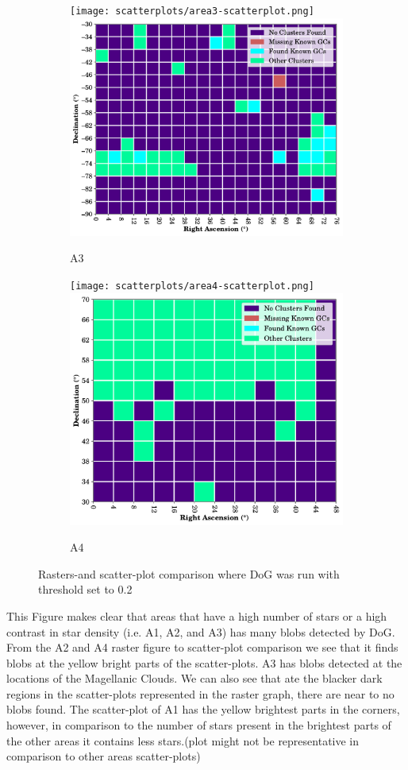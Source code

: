 \begin{figure}[H]
    \begin{subfigure}[b]{0.49\textwidth}
        \texttt{[image: scatterplots/area3-scatterplot.png]}
        \includegraphics[height=0.6\textwidth]{./figures/rasters/grids/grid-dog-a3.pdf}
        \caption{A3}
        \label{fig:a3-dog-overview}
    \end{subfigure}
    \begin{subfigure}[b]{0.49\textwidth}
        \texttt{[image: scatterplots/area4-scatterplot.png]}
        \includegraphics[height=0.6\textwidth]{./figures/rasters/grids/grid-dog-a4.pdf}
        \caption{A4}
        \label{fig:a4-dog-overview}
    \end{subfigure}

    \caption{Rasters-and scatter-plot comparison where DoG was run with threshold set to 0.2}
    \label{fig:filtered-dog-rasters}
\end{figure}

This Figure makes clear that areas that have a high number of stars  or a high contrast in star density (i.e. A1, A2, and A3) has many blobs detected by DoG. From the A2 and A4 raster figure to scatter-plot comparison we see that it finds blobs at the yellow bright parts of the scatter-plots. A3 has blobs detected at the locations of the Magellanic Clouds. We can also see that ate the blacker dark regions in the scatter-plots represented in the raster graph, there are near to no blobs found. The scatter-plot of A1 has the yellow brightest parts in the corners, however, in comparison to the number of stars present in the brightest parts of the other areas it contains less stars.(plot might not be representative in comparison to other areas scatter-plots)


